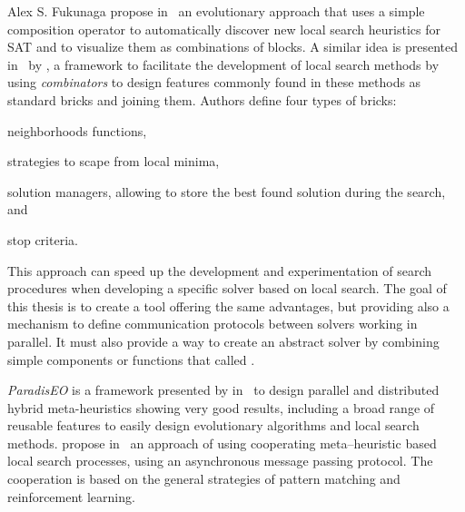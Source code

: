 Alex S. Fukunaga propose in~\cite{Fukunaga2008} an evolutionary approach that uses a simple composition operator to automatically discover new local search heuristics for SAT and to visualize them as combinations of blocks. A similar idea is presented in~\cite{Landtsheer2015} by , a framework to facilitate the development of local search methods by using \textit{combinators} to design features commonly found in these methods as standard bricks and joining them. Authors define four types of bricks: \begin{inparaenum}[1-] \item neighborhoods functions, \item strategies to scape from local minima, \item solution managers, allowing to store the best found solution during the search, and \item stop criteria.
\end{inparaenum} This approach can speed up the development and experimentation of search procedures when developing a specific solver based on local search. The goal of this thesis is to create a tool offering the same advantages, but providing also a mechanism to define communication protocols between solvers working in parallel. It must also provide a way to create an abstract solver by combining simple components or functions that called \ms.

{\it ParadisEO} is a framework presented by  in~\cite{Cahon2004} to design parallel and distributed hybrid meta-heuristics showing very good results, including a broad range of reusable features to easily design evolutionary algorithms and local search methods.  propose in~\cite{Martin2016} an approach of using cooperating meta--heuristic based local search processes, using an asynchronous message passing protocol. The cooperation is based on the general strategies of pattern matching and reinforcement learning. 


